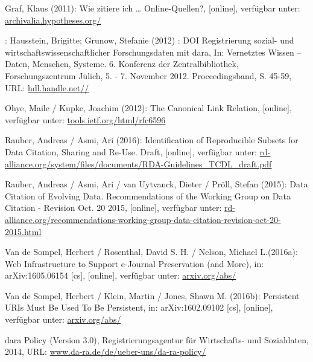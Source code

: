 \documentclass[12pt, a4paper]{article}
\begin{document}
\begin{thebibliography}{99}
Graf, Klaus (2011): Wie zitiere ich \ldots{}
  Online-Quellen?, {[}online{]}, verfügbar unter:
  \href{https://archivalia.hypotheses.org/13353}{archivalia.hypotheses.org/}

: Hausstein, Brigitte; Grunow, Stefanie
  (2012) : DOI Registrierung sozial- und wirtschaftswissenschaftlicher
  Forschungsdaten mit dara, In: Vernetztes Wissen – Daten, Menschen,
  Systeme. 6. Konferenz der Zentralbibliothek, Forschungszentrum
  Jülich, 5. - 7.  November 2012. Proceedingsband, S. 45-59, URL:
  \href{http://hdl.handle.net/11108/81}{hdl.handle.net//}

Ohye, Maile / Kupke, Joachim (2012): The Canonical Link Relation,
{[}online{]}, verfügbar unter:
\href{https://tools.ietf.org/html/rfc6596}{tools.ietf.org/\-html/\-rfc6596}

Rauber, Andreas / Asmi, Ari (2016): Identification of Reproducible
Subsets for Data Citation, Sharing and Re-Use. Draft, {[}online{]},
verfügbar unter:
\href{https://rd-alliance.org/system/files/documents/RDA-Guidelines_TCDL_draft.pdf}{rd-alliance.org/\-system/\-files/\-documents/\-RDA-Guidelines\_TCDL\_draft.pdf}

Rauber, Andreas / Asmi, Ari / van Uytvanck, Dieter / Pröll, Stefan
(2015): Data Citation of Evolving Data. Recommendations of the Working
Group on Data Citation - Revision Oct. 20 2015, {[}online{]}, verfügbar
unter:
\href{https://rd-alliance.org/recommendations-working-group-data-citation-revision-oct-20-2015.html}{rd-alliance.org/\-recommendations-working-group-data-citation-revision-oct-20-2015.html}

Van de Sompel, Herbert / Rosenthal, David S. H. / Nelson, Michael
L.(2016a): Web Infrastructure to Support e-Journal Preservation (and
More), in: arXiv:1605.06154 {[}cs{]}, {[}online{]}, verfügbar unter:
\href{http://arxiv.org/abs/1605.06154}{arxiv.org/\-abs/}

Van de Sompel, Herbert / Klein, Martin / Jones, Shawn M. (2016b):
Persistent URIs Must Be Used To Be Persistent, in: arXiv:1602.09102
{[}cs{]}, {[}online{]}, verfügbar unter:
\href{http://arxiv.org/abs/1602.09102}{arxiv.org/\-abs/}

 da\textbar ra Policy (Version 3.0), Registrierungsagentur
  für Wirtschafts- und Sozialdaten, 2014, URL: \href{http://www.da-ra.de/de/ueber-uns/da-ra-policy/}{www.da-ra.de/\-de/\-ueber-uns/\-da-ra-policy/}

\end{thebibliography}
\end{document}

